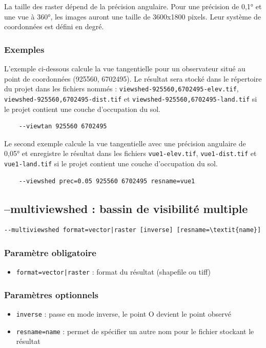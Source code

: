 \documentclass{report}
\begin{document}
La taille des raster dépend de la précision angulaire. Pour une précision de 0,1° et une vue à 360°, les images auront une taille de 3600x1800 pixels. Leur système de coordonnées est défini en degré. 

\subsubsection{Exemples}
L'exemple ci-dessous calcule la vue tangentielle pour un observateur situé au point de coordonnées (925560, 6702495). Le résultat sera stocké dans le répertoire du projet dans les fichiers nommés : \verb|viewshed-925560,6702495-elev.tif|, \verb|viewshed-925560,6702495-dist.tif| et \verb|viewshed-925560,6702495-land.tif| si le projet contient une couche d'occupation du sol.
\begin{Verbatim}
	--viewtan 925560 6702495
\end{Verbatim}

Le second exemple calcule la vue tangentielle avec une précision angulaire de 0,05° et enregistre le résultat dans les fichiers \verb|vue1-elev.tif|, \verb|vue1-dist.tif| et \verb|vue1-land.tif| si le projet contient une couche d'occupation du sol.
\begin{Verbatim}
	--viewshed prec=0.05 925560 6702495 resname=vue1
\end{Verbatim}


\subsection{--multiviewshed : bassin de visibilité multiple}
\begin{Verbatim}[commandchars=\\\{\}]
--multiviewshed format=vector|raster [inverse] [resname=\textit{name}]
\end{Verbatim}

\subsubsection{Paramètre obligatoire}
\begin{itemize}
	\item \verb/format=vector|raster/ : format du résultat (shapefile ou tiff)
\end{itemize}

\subsubsection{Paramètres optionnels}
\begin{itemize}
	\item \verb|inverse| : passe en mode inverse, le point O devient le point observé
	\item \verb|resname=name| : permet de spécifier un autre nom pour le fichier stockant le résultat
\end{itemize}
\end{document}
